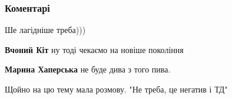  
 
 
 
 
\subsubsection{Коментарі}
\label{sec:30_06_2021.fb.haperskaja_marina.1.mova_futbol.cmt}

\begin{itemize}
 
Ше лагідніше треба)))

\begin{itemize}
 
\textbf{Вчоний Кіт} ну тоді чекаємо на новіше покоління

 
\textbf{Марина Хаперська} не буде дива з того пива.
\end{itemize}

 
Щойно на цю тему мала розмову. "Не треба, це негатив і ТД"

 


\end{itemize}
